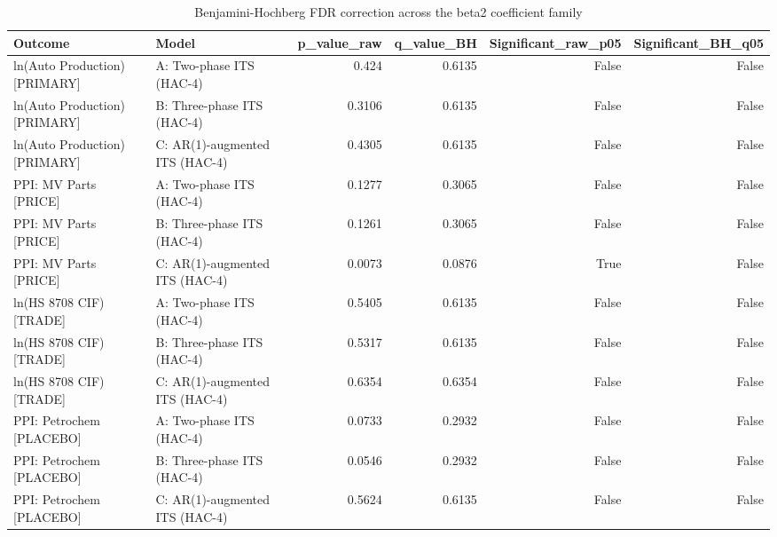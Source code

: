 \begin{table}
\caption{Benjamini-Hochberg FDR correction across the beta2 coefficient family}
\label{tab:table3_multiple_testing_correction}
\begin{tabular}{llrrrr}
\toprule
Outcome & Model & p\_value\_raw & q\_value\_BH & Significant\_raw\_p05 & Significant\_BH\_q05 \\
\midrule
ln(Auto Production) [PRIMARY] & A: Two-phase ITS (HAC-4) & 0.424 & 0.6135 & False & False \\
ln(Auto Production) [PRIMARY] & B: Three-phase ITS (HAC-4) & 0.3106 & 0.6135 & False & False \\
ln(Auto Production) [PRIMARY] & C: AR(1)-augmented ITS (HAC-4) & 0.4305 & 0.6135 & False & False \\
PPI: MV Parts [PRICE] & A: Two-phase ITS (HAC-4) & 0.1277 & 0.3065 & False & False \\
PPI: MV Parts [PRICE] & B: Three-phase ITS (HAC-4) & 0.1261 & 0.3065 & False & False \\
PPI: MV Parts [PRICE] & C: AR(1)-augmented ITS (HAC-4) & 0.0073 & 0.0876 & True & False \\
ln(HS 8708 CIF) [TRADE] & A: Two-phase ITS (HAC-4) & 0.5405 & 0.6135 & False & False \\
ln(HS 8708 CIF) [TRADE] & B: Three-phase ITS (HAC-4) & 0.5317 & 0.6135 & False & False \\
ln(HS 8708 CIF) [TRADE] & C: AR(1)-augmented ITS (HAC-4) & 0.6354 & 0.6354 & False & False \\
PPI: Petrochem [PLACEBO] & A: Two-phase ITS (HAC-4) & 0.0733 & 0.2932 & False & False \\
PPI: Petrochem [PLACEBO] & B: Three-phase ITS (HAC-4) & 0.0546 & 0.2932 & False & False \\
PPI: Petrochem [PLACEBO] & C: AR(1)-augmented ITS (HAC-4) & 0.5624 & 0.6135 & False & False \\
\bottomrule
\end{tabular}
\end{table}
